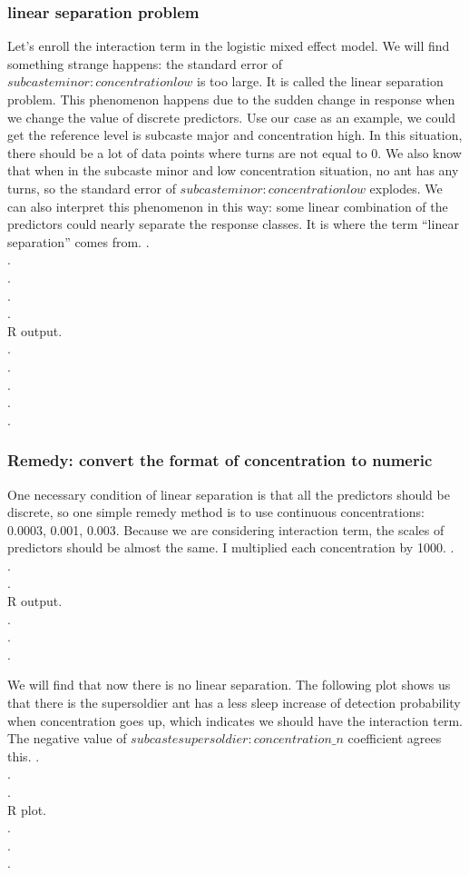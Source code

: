 \documentclass{article}
\begin{document}
		\subsubsection{linear separation problem}
		Let’s enroll the interaction term in the logistic mixed effect model. We will find something strange happens: the standard error of $subcasteminor:concentrationlow$ is too large. It is called the linear separation problem. This phenomenon happens due to the sudden change in response when we change the value of discrete predictors. Use our case as an example, we could get the reference level is subcaste major and concentration high. In this situation, there should be a lot of data points where turns are not equal to 0. We also know that when in the subcaste minor and low concentration situation, no ant has any turns, so the standard error of $subcasteminor:concentrationlow$ explodes. We can also interpret this phenomenon in this way: some linear combination of the predictors could nearly separate the response classes. It is where the term “linear separation” comes from.
		.\\
		.\\
		.\\
		.\\
		.\\
		R output.\\
		.\\
		.\\
		.\\
		.\\
		. 
		\subsubsection{Remedy: convert the format of concentration to numeric}
		One necessary condition of linear separation is that all the predictors should be discrete, so one simple remedy method is to use continuous concentrations: 0.0003, 0.001, 0.003. Because we are considering interaction term, the scales of predictors should be almost the same. I multiplied each concentration by 1000.
		.\\
		.\\
		.\\
		R output.\\
		.\\
		.\\
		.
		
		We will find that now there is no linear separation. The following plot shows us that there is the supersoldier ant has a less sleep increase of detection probability when concentration goes up, which indicates we should have the interaction term. The negative value of $subcastesupersoldier:concentration\_n$ coefficient agrees this.
		.\\
		.\\
		.\\
		R plot.\\
		.\\
		.\\
		.
\end{document}
